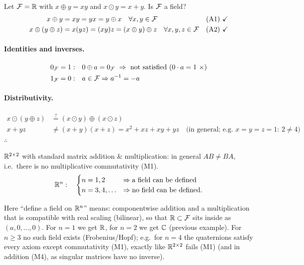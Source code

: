\begin{example}
Let $\mathcal{F}=\mathbb{R}$ with $x\oplus y = xy$ and $x\odot y = x+y$. Is $\mathcal{F}$ a field?
\begin{align*}
x\oplus y &= xy = yx = y\oplus x \quad \forall x,y\in\mathcal{F} && \text{(A1)}\ \checkmark\\
x\oplus(y\oplus z) &= x(yz) = (xy)z = (x\oplus y)\oplus z \quad \forall x,y,z\in\mathcal{F} && \text{(A2)}\ \checkmark
\end{align*}
\paragraph{Identities and inverses.}
\begin{align*}
0_{\mathcal{F}} &= 1: && 0\oplus a = 0_{\mathcal{F}} \ \Rightarrow\ \text{not satisfied } (0\cdot a = 1 \ \times)\\
1_{\mathcal{F}} &= 0: && a\in\mathcal{F} \Rightarrow a^{-1} = -a
\end{align*}
\paragraph{Distributivity.}
\begin{align*}
x\odot(y\oplus z) &\overset{?}{=} (x\odot y)\oplus(x\odot z)\\
x+yz &\neq (x+y)(x+z) = x^2+xz+xy+yz \quad\text{(in general; e.g.\ $x=y=z=1$: $2\neq4$)}
\end{align*}
$\therefore$ 
\end{example}

\begin{example}
$\mathbb{R}^{2\times2}$ with standard matrix addition \& multiplication: in general $AB\neq BA$, i.e.\ there is no multiplicative commutativity (M1).
\[
\mathbb{R}^n:\quad
\begin{cases}
n=1,2 & \Rightarrow \text{a field can be defined}\\
n=3,4,\dots & \Rightarrow \text{no field can be defined.}
\end{cases}
\]
\begin{insight}
Here ``define a field on $\mathbb{R}^n$'' means: componentwise addition and a multiplication that is compatible with real scaling (bilinear), so that $\mathbb{R}\subset\mathcal{F}$ sits inside as $(a,0,\dots,0)$. For $n=1$ we get $\mathbb{R}$, for $n=2$ we get $\mathbb{C}$ (previous example). For $n\ge3$ no such field exists (Frobenius/Hopf); e.g.\ for $n=4$ the quaternions satisfy every axiom except commutativity (M1), exactly like $\mathbb{R}^{2\times2}$ fails (M1) (and in addition (M4), as singular matrices have no inverse).
\end{insight}
\end{example}

